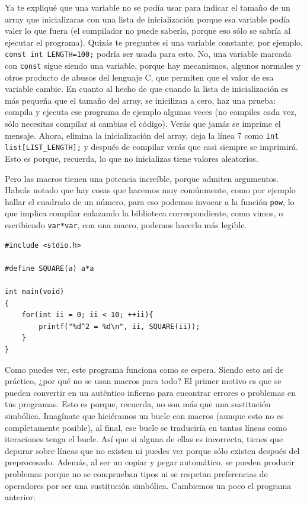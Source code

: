 \documentclass[a4paper]{article}
\begin{document}
Ya te expliqué que una variable no se podía usar para indicar el tamaño de un
array que inicializaras con una lista de inicialización
porque esa variable podía valer lo que fuera (el
compilador no puede saberlo, porque eso sólo se sabría al ejecutar el programa).
Quizás te preguntes si una variable constante, por ejemplo,
\verb!const int LENGTH=100;! podría ser usada para esto.
No, una variable marcada con
\verb!const! sigue siendo una variable, porque hay mecanismos, algunos normales
y otros producto de abusos del lenguaje C, que permiten que el valor de esa
variable cambie. En cuanto al hecho de que cuando la lista de inicialización es
más pequeña que el tamaño del array, se inicilizan a cero, haz una prueba:
compila y ejecuta ese programa de ejemplo
algunas veces (no compiles cada vez, sólo necesitas compilar si cambias el
código). Verás que jamás se imprime el mensaje. Ahora, elimina la inicialización
del array, deja la línea 7 como \verb!int list[LIST_LENGTH];! y después de
compilar verás que casi siempre se imprimirá. Esto es porque, recuerda, lo que
no inicializas tiene valores aleatorios.

Pero las macros tienen una potencia increíble, porque admiten argumentos.
Habrás notado que hay cosas que hacemos muy comúnmente, como por ejemplo hallar
el cuadrado de un número, para eso podemos invocar a la función \verb!pow!, lo
que implica compilar enlazando la biblioteca correspondiente, como vimos, o
escribiendo \verb!var*var!, con una macro, podemos hacerlo más legible.

\noindent
\begin{minipage}[H]{\linewidth}
\mbox{}
\begin{lstlisting}[style=C,
caption={Uso de macro con argumentos},
label={lst:macroWithArguments}]
#include <stdio.h>

#define SQUARE(a) a*a

int main(void)
{
    for(int ii = 0; ii < 10; ++ii){
        printf("%d^2 = %d\n", ii, SQUARE(ii));
    }
}
\end{lstlisting}
\end{minipage}

Como puedes ver, este programa funciona como se espera. Siendo esto así de
práctico, ¿por qué no se usan macros para todo?
El primer motivo es que se pueden convertir
en un auténtico infierno para encontrar errores o problemas en tus programas.
Esto es porque, recuerda, no son más que una sustitución simbólica. Imagínate
que hiciéramos un bucle con macros (aunque esto no es completamente posible),
al final, ese
bucle se traduciría en tantas líneas como iteraciones tenga el bucle. Así que si
alguna de ellas es incorrecta, tienes que depurar sobre líneas que no existen ni
puedes ver porque sólo existen después del preprocesado. Además, al ser un
copiar y pegar automático, se pueden producir problemas porque no se comprueban
tipos ni se respetan preferencias de operadores por ser una sustitución
simbólica. Cambiemos un poco el programa anterior:
\end{document}
